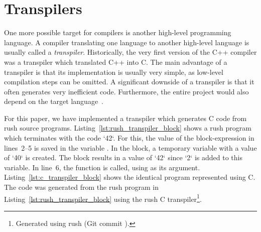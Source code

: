 \newpage
\section{Transpilers}

One more possible target for compilers is another high-level programming language.
A compiler translating one language to another high-level language is usually called a \emph{transpiler}.
Historically, the very first version of the C++ compiler was a transpiler which translated C++ into C.
The main advantage of a transpiler is that its implementation is usually very simple, as low-level compilation steps can be omitted.
A significant downside of a transpiler is that it often generates very inefficient code.
Furthermore, the entire project would also depend on the target language~\cite[p.~5]{Jeffery2021}.

For this paper, we have implemented a transpiler which generates C code from rush source programs.
Listing~\ref{lst:rush_transpiler_block} shows a rush program which terminates with the code `42`.
For this, the value of the block-expression in lines~2--5 is saved in the variable .
In the block, a temporary variable with a value of `40` is created.
The block results in a value of `42` since `2` is added to this variable.
In line~6, the  function is called, using  as its argument.
Listing~\ref{lst:c_transpiler_block} shows the identical program represented using C.
The code was generated from the rush program in Listing~\ref{lst:rush_transpiler_block} using the rush C transpiler\footnote{Generated using rush (Git commit \rushCommit{}).}.

\noindent
\begin{minipage}{.45\textwidth}
	\centering
\end{minipage}%
\hfill%
\begin{minipage}{.45\textwidth}
	\centering
	\vspace{.1cm}
\end{minipage}

